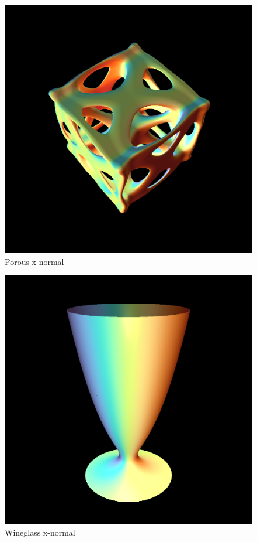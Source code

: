 \documentclass[acmtog]{acmart}
\begin{document}
\begin{figure}[h]
    \centering
    \includegraphics[scale=0.35]{../Coding/images/fw_porous_surf.png}
    \caption{Porous x-normal}
\end{figure}

\begin{figure}[h]
    \centering
    \includegraphics[scale=0.35]{../Coding/images/fw_wineglass.png}
    \caption{Wineglass x-normal}
\end{figure}
\end{document}
